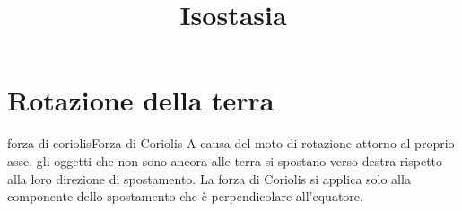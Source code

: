 \documentclass[preview]{standalone}
\begin{document}
\title{Isostasia}
\genpage

\section{Rotazione della terra}


\begin{snippetdefinition}{forza-di-coriolis}{Forza di Coriolis}
    A causa del moto di rotazione attorno al proprio asse,
    gli oggetti che non sono ancora alle terra si spostano verso destra rispetto alla loro direzione di spostamento.
    La forza di Coriolis si applica solo alla componente dello spostamento che è perpendicolare all'equatore.
\end{snippetdefinition}

\end{document}

